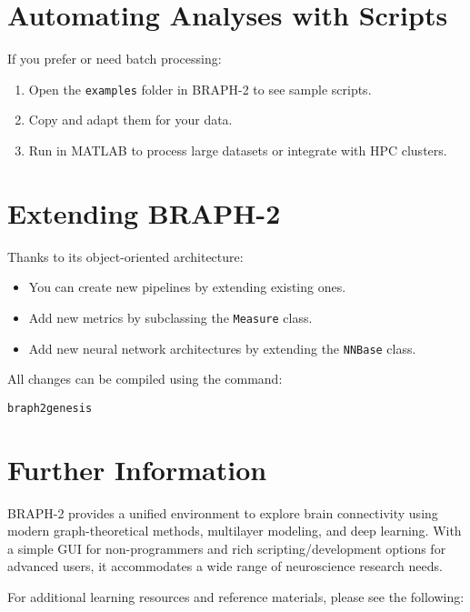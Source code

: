\documentclass[justified]{tufte-handout}
\begin{document}
\section{Automating Analyses with Scripts}

If you prefer or need batch processing:
\begin{enumerate}

\item Open the \texttt{examples} folder in BRAPH-2 to see sample scripts.

\item Copy and adapt them for your data.  

\item Run in MATLAB to process large datasets or integrate with HPC clusters.

\end{enumerate}

\section{Extending BRAPH-2}

Thanks to its object-oriented architecture:
\begin{itemize}

\item You can create new pipelines by extending existing ones.

\item Add new metrics by subclassing the \texttt{Measure} class.

\item Add new neural network architectures by extending the \texttt{NNBase} class.

\end{itemize}
All changes can be compiled using the command:

\lstinline{braph2genesis}

\section{Further Information}

BRAPH-2 provides a unified environment to explore brain connectivity using modern graph-theoretical methods, multilayer modeling, and deep learning. 
With a simple GUI for non-programmers and rich scripting/development options for advanced users, it accommodates a wide range of neuroscience research needs.

For additional learning resources and reference materials, please see the following:
\end{document}
